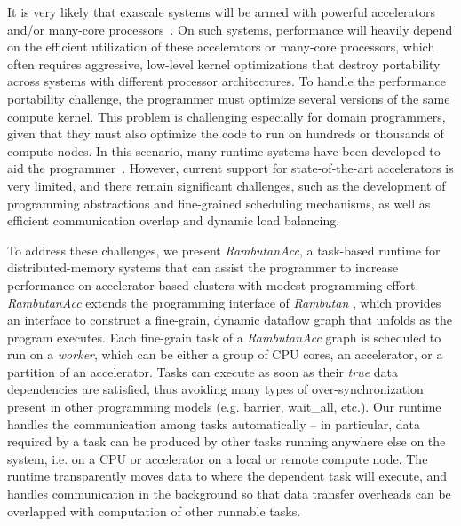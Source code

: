 It is very likely that exascale systems will be armed with powerful accelerators and/or many-core processors~\cite{ASCR/Exascale/Lethin, exascaleRoadMap}.
On such systems, performance will heavily depend on the efficient utilization of these accelerators or many-core processors, which often requires aggressive, low-level kernel optimizations that destroy portability across systems with different processor architectures.
To handle the performance portability challenge, the programmer must optimize several versions of the same compute kernel.
This problem is challenging especially for domain programmers, given that they must also optimize the code to run on hundreds or thousands of compute nodes.
In this scenario, many runtime systems have been developed to aid the programmer~\cite{legion,physics,mpiacc,mvapich2gpu}.
However, current support for state-of-the-art accelerators is very limited, and there remain significant challenges, such as the development of programming abstractions and fine-grained scheduling mechanisms, as well as efficient communication overlap and dynamic load balancing.  

To address these challenges, we present {\em RambutanAcc}, a task-based runtime for distributed-memory systems that can assist the programmer to increase performance on accelerator-based clusters with modest programming effort.
{\em RambutanAcc} extends the programming interface of {\em Rambutan} \cite{rambutanWebsite}, which provides an interface to construct a fine-grain, dynamic dataflow graph that unfolds as the program executes. 
Each fine-grain task of a {\em RambutanAcc} graph is scheduled to run on a {\em worker}, which can be either a group of CPU cores, an accelerator, or a partition of an accelerator.
Tasks can execute as soon as their {\em true} data dependencies are satisfied, thus avoiding many types of over-synchronization present in other programming models (e.g. barrier, wait\_all, etc.).
Our runtime handles the communication among tasks automatically -- in particular, data required by a task can be produced by other tasks running anywhere else on the system, i.e. on a CPU or accelerator on a local or remote compute node.
The runtime transparently moves data to where the dependent task will execute, and
handles communication in the background so that data transfer overheads can be overlapped with computation of other runnable tasks.

